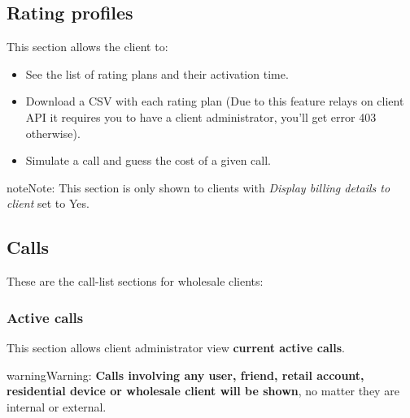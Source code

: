 \documentclass[letterpaper,10pt,english]{sphinxmanual}
\begin{document}
\subsection{Rating profiles}
\label{administration_portal/client/wholesale/rating_profiles:rating-profiles}\label{administration_portal/client/wholesale/rating_profiles::doc}
This section allows the client to:
\begin{itemize}
\item {} 
See the list of rating plans and their activation time.

\item {} 
Download a CSV with each rating plan (Due to this feature relays on client API it requires you to have a client administrator, you'll get error 403 otherwise).

\item {} 
Simulate a call and guess the cost of a given call.

\end{itemize}

\begin{notice}{note}{Note:}
This section is only shown to clients with \emph{Display billing details to client} set to Yes.
\end{notice}


\subsection{Calls}
\label{administration_portal/client/wholesale/calls/index::doc}\label{administration_portal/client/wholesale/calls/index:calls}
These are the call-list sections for wholesale clients:


\subsubsection{Active calls}
\label{administration_portal/client/wholesale/calls/active_calls::doc}\label{administration_portal/client/wholesale/calls/active_calls:active-calls}
This section allows client administrator view \textbf{current active calls}.

\begin{notice}{warning}{Warning:}
\textbf{Calls involving any user, friend, retail account, residential device or wholesale client will be shown},
no matter they are internal or external.
\end{notice}
\end{document}
